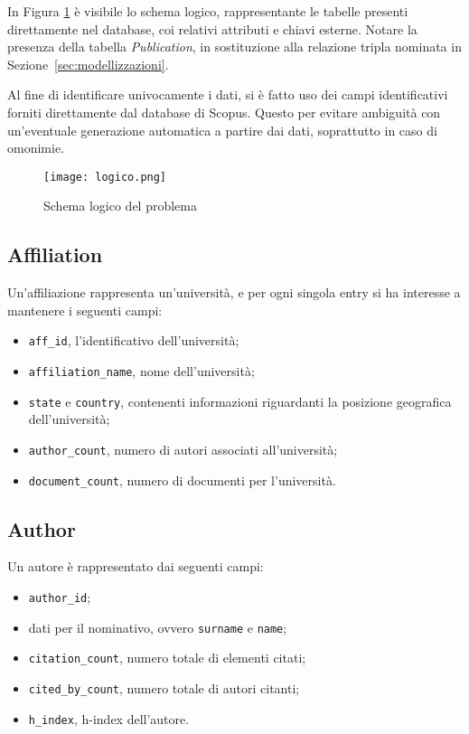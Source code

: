 In Figura \ref{fig:logico} è visibile lo schema logico, rappresentante
le tabelle presenti direttamente nel database, coi relativi attributi e chiavi
esterne. Notare la presenza della tabella \textit{Publication}, in sostituzione
alla relazione tripla nominata in Sezione~\ref{sec:modellizzazioni}.

Al fine di identificare univocamente i dati, si è fatto uso dei campi
identificativi forniti direttamente dal database di Scopus. Questo per evitare
ambiguità con un'eventuale generazione automatica a partire dai dati,
soprattutto in caso di omonimie.

\begin{figure}
  \centering
  \texttt{[image: logico.png]}
  \caption{Schema logico del problema}
  \label{fig:logico}
\end{figure}

\subsection{Affiliation}

Un'affiliazione rappresenta un'università, e per ogni singola entry si ha
interesse a mantenere i seguenti campi:

\begin{itemize}
  \item \texttt{aff\_id}, l'identificativo dell'università;
  \item \texttt{affiliation\_name}, nome dell'università;
  \item \texttt{state} e \texttt{country}, contenenti informazioni riguardanti la posizione geografica dell'università;
  \item \texttt{author\_count}, numero di autori associati all'università;
  \item \texttt{document\_count}, numero di documenti per l'università.
\end{itemize}

\subsection{Author}
Un autore è rappresentato dai seguenti campi:
\begin{itemize}
  \item \texttt{author\_id};
  \item dati per il nominativo, ovvero \texttt{surname} e \texttt{name};
  \item \texttt{citation\_count}, numero totale di elementi citati;
  \item \texttt{cited\_by\_count}, numero totale di autori citanti;
  \item \texttt{h\_index}, h-index dell'autore.
\end{itemize}

